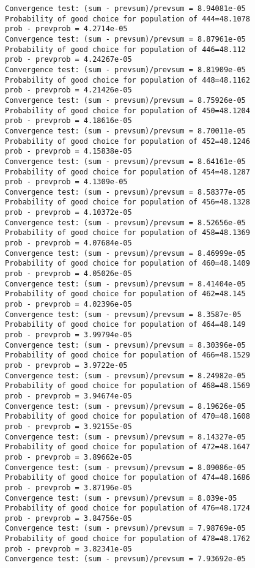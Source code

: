 \documentclass[11pt,onecolumn]{article}
\begin{document}
\begin{verbatim}
Convergence test: (sum - prevsum)/prevsum = 8.94081e-05
Probability of good choice for population of 444=48.1078
prob - prevprob = 4.2714e-05
Convergence test: (sum - prevsum)/prevsum = 8.87961e-05
Probability of good choice for population of 446=48.112
prob - prevprob = 4.24267e-05
Convergence test: (sum - prevsum)/prevsum = 8.81909e-05
Probability of good choice for population of 448=48.1162
prob - prevprob = 4.21426e-05
Convergence test: (sum - prevsum)/prevsum = 8.75926e-05
Probability of good choice for population of 450=48.1204
prob - prevprob = 4.18616e-05
Convergence test: (sum - prevsum)/prevsum = 8.70011e-05
Probability of good choice for population of 452=48.1246
prob - prevprob = 4.15838e-05
Convergence test: (sum - prevsum)/prevsum = 8.64161e-05
Probability of good choice for population of 454=48.1287
prob - prevprob = 4.1309e-05
Convergence test: (sum - prevsum)/prevsum = 8.58377e-05
Probability of good choice for population of 456=48.1328
prob - prevprob = 4.10372e-05
Convergence test: (sum - prevsum)/prevsum = 8.52656e-05
Probability of good choice for population of 458=48.1369
prob - prevprob = 4.07684e-05
Convergence test: (sum - prevsum)/prevsum = 8.46999e-05
Probability of good choice for population of 460=48.1409
prob - prevprob = 4.05026e-05
Convergence test: (sum - prevsum)/prevsum = 8.41404e-05
Probability of good choice for population of 462=48.145
prob - prevprob = 4.02396e-05
Convergence test: (sum - prevsum)/prevsum = 8.3587e-05
Probability of good choice for population of 464=48.149
prob - prevprob = 3.99794e-05
Convergence test: (sum - prevsum)/prevsum = 8.30396e-05
Probability of good choice for population of 466=48.1529
prob - prevprob = 3.9722e-05
Convergence test: (sum - prevsum)/prevsum = 8.24982e-05
Probability of good choice for population of 468=48.1569
prob - prevprob = 3.94674e-05
Convergence test: (sum - prevsum)/prevsum = 8.19626e-05
Probability of good choice for population of 470=48.1608
prob - prevprob = 3.92155e-05
Convergence test: (sum - prevsum)/prevsum = 8.14327e-05
Probability of good choice for population of 472=48.1647
prob - prevprob = 3.89662e-05
Convergence test: (sum - prevsum)/prevsum = 8.09086e-05
Probability of good choice for population of 474=48.1686
prob - prevprob = 3.87196e-05
Convergence test: (sum - prevsum)/prevsum = 8.039e-05
Probability of good choice for population of 476=48.1724
prob - prevprob = 3.84756e-05
Convergence test: (sum - prevsum)/prevsum = 7.98769e-05
Probability of good choice for population of 478=48.1762
prob - prevprob = 3.82341e-05
Convergence test: (sum - prevsum)/prevsum = 7.93692e-05

\end{verbatim}
\end{document}
